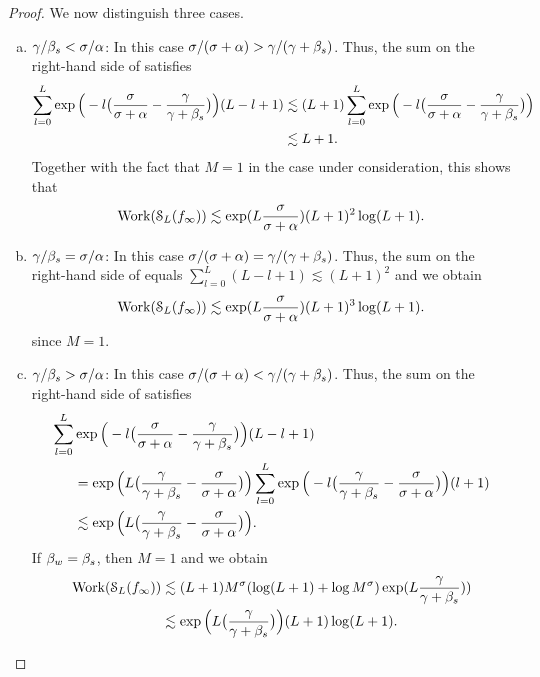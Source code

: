 \begin{proof}
	We now distinguish three cases.
	\begin{enumerate}[(a)]
		\item $\gamma/\beta_{s}<\sigma/\alpha$: In this case $\sigma/(\sigma+\alpha)>\gamma/(\gamma+\beta_{s})$. Thus, the sum on the right-hand side of  satisfies
		\begin{equation*}
		\begin{split}
		\sum_{l=0}^{L}\exp\Big(-l\big(\frac{\sigma}{\sigma+\alpha}-\frac{\gamma}{\gamma+\beta_{s}}\big)\Big)(L-l+1)&\lesssim (L+1)\sum_{l=0}^{L}\exp\Big(-l\big(\frac{\sigma}{\sigma+\alpha}-\frac{\gamma}{\gamma+\beta_{s}}\big)\Big)\\
		&\lesssim L+1.
		\end{split}
		\end{equation*}
		Together with the fact that $M=1$ in the case under consideration, this shows that
		\begin{equation*}
		\text{Work}(\mathcal{S}_{L}(f_{\infty}))\lesssim \exp(L\frac{\sigma}{\sigma+\alpha})(L+1)^2\log (L+1).
		\end{equation*}
		
		\item $\gamma/\beta_{s}=\sigma/\alpha$:  In this case $\sigma/(\sigma+\alpha)=\gamma/(\gamma+\beta_{s})$. Thus, the sum on the right-hand side of  equals $\sum_{l=0}^{L}(L-l+1)\lesssim (L+1)^2$ and we obtain
		\begin{equation*}
		\text{Work}(\mathcal{S}_{L}(f_{\infty}))\lesssim \exp(L\frac{\sigma}{\sigma+\alpha})(L+1)^3\log (L+1).
		\end{equation*}
		since $M=1$.
		
		\item $\gamma/\beta_{s}>\sigma/\alpha$:  In this case $\sigma/(\sigma+\alpha)<\gamma/(\gamma+\beta_{s})$. Thus, the sum on the right-hand side of  satisfies 
		\begin{equation*}
		\begin{split}
		\sum_{l=0}^{L}&\exp\Big(-l\big(\frac{\sigma}{\sigma+\alpha}-\frac{\gamma}{\gamma+\beta_{s}}\big)\Big)(L-l+1)\\
		&=\exp\Big(L\big(\frac{\gamma}{\gamma+\beta_{s}}-\frac{\sigma}{\sigma+\alpha}\big)\Big)\sum_{l=0}^{L}\exp\Big(-l\big(\frac{\gamma}{\gamma+\beta_{s}}-\frac{\sigma}{\sigma+\alpha}\big)\Big)(l+1)\\
		&\lesssim\exp\Big(L\big(\frac{\gamma}{\gamma+\beta_{s}}-\frac{\sigma}{\sigma+\alpha}\big)\Big).
		\end{split}
		\end{equation*}
		If $\beta_{w}=\beta_{s}$, then $M=1$ and we obtain
		\begin{equation*}
		\begin{split}
		\text{Work}(\mathcal{S}_{L}(f_{\infty}))&\lesssim (L+1)M^{\sigma}(\log(L+1)+\log M^{\sigma})\exp(L\frac{\gamma}{\gamma+\beta_{s}}))\\
		&\lesssim \exp\Big(L\big(\frac{\gamma}{\gamma+\beta_{s}}\big)\Big) (L+1)\log(L+1).
		\end{split}
		\end{equation*} 
	

\end{enumerate}
\end{proof}
